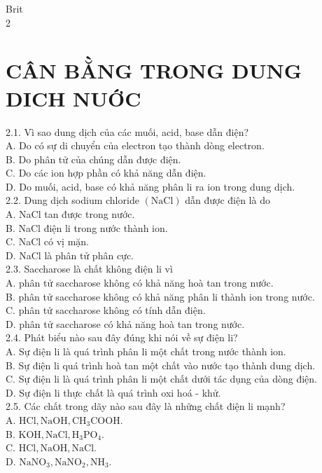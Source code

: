 \documentclass[10pt]{article}
\begin{document}
Brit\\
2

\section*{CÂN BẰNG TRONG DUNG DICH NUỚC}
2.1. Vì sao dung dịch của các muối, acid, base dẫn điện?\\
A. Do có sự di chuyển của electron tạo thành dòng electron.\\
B. Do phân tử của chúng dẫn được điện.\\
C. Do các ion hợp phần có khả năng dẫn điện.\\
D. Do muối, acid, base có khả năng phân li ra ion trong dung dịch.\\
2.2. Dung dịch sodium chloride $(\mathrm{NaCl})$ dẫn được điện là do\\
A. NaCl tan được trong nước.\\
B. NaCl điện li trong nước thành ion.\\
C. NaCl có vị mặn.\\
D. NaCl là phân tử phân cực.\\
2.3. Saccharose là chất không điện li vì\\
A. phân tử saccharose không có khả năng hoà tan trong nước.\\
B. phân tử saccharose không có khả năng phân li thành ion trong nước.\\
C. phân tử saccharose không có tính dẫn điện.\\
D. phân tử saccharose có khả năng hoà tan trong nước.\\
2.4. Phát biểu nào sau đây đúng khi nói về sự điện li?\\
A. Sự điện li là quá trình phân li một chất trong nước thành ion.\\
B. Sự điện li quá trình hoà tan một chất vào nước tạo thành dung dịch.\\
C. Sự điện li là quá trình phân li một chất dưới tác dụng của dòng điện.\\
D. Sự điện li thực chất là quá trình oxi hoá - khử.\\
2.5. Các chất trong dãy nào sau đây là những chất điện li mạnh?\\
A. $\mathrm{HCl}, \mathrm{NaOH}, \mathrm{CH}_{3} \mathrm{COOH}$.\\
B. $\mathrm{KOH}, \mathrm{NaCl}, \mathrm{H}_{3} \mathrm{PO}_{4}$.\\
C. $\mathrm{HCl}, \mathrm{NaOH}, \mathrm{NaCl}$.\\
D. $\mathrm{NaNO}_{3}, \mathrm{NaNO}_{2}, \mathrm{NH}_{3}$.\\
\end{document}
